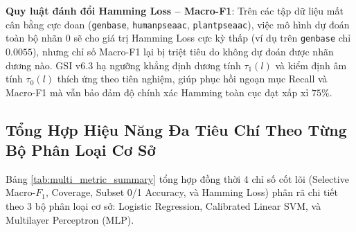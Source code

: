 \documentclass[10pt,a4paper,twoside]{article}
\begin{document}
\noindent\textbf{Quy luật đánh đổi Hamming Loss -- Macro-F1}: Trên các tập dữ liệu mất cân bằng cực đoan (\texttt{genbase}, \texttt{humanpseaac}, \texttt{plantpseaac}), việc mô hình dự đoán toàn bộ nhãn $0$ sẽ cho giá trị Hamming Loss cực kỳ thấp (ví dụ trên \texttt{genbase} chỉ $0.0055$), nhưng chỉ số Macro-F1 lại bị triệt tiêu do không dự đoán được nhãn dương nào. GSI v6.3 hạ ngưỡng khẳng định dương tính $\tau_1(l)$ và kiểm định âm tính $\tau_0(l)$ thích ứng theo tiên nghiệm, giúp phục hồi ngoạn mục Recall và Macro-F1 mà vẫn bảo đảm độ chính xác Hamming toàn cục đạt xấp xỉ $75\%$.

\clearpage
\subsection{Tổng Hợp Hiệu Năng Đa Tiêu Chí Theo Từng Bộ Phân Loại Cơ Sở}
Bảng \ref{tab:multi_metric_summary} tổng hợp đồng thời 4 chỉ số cốt lõi (Selective Macro-$F_1$, Coverage, Subset 0/1 Accuracy, và Hamming Loss) phân rã chi tiết theo 3 bộ phân loại cơ sở: Logistic Regression, Calibrated Linear SVM, và Multilayer Perceptron (MLP).
\end{document}
